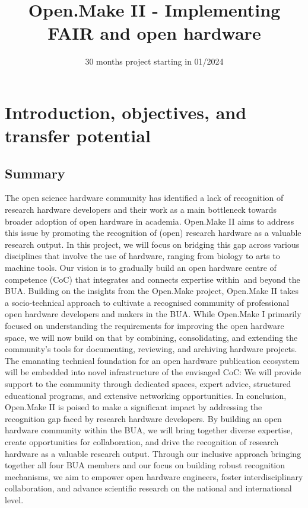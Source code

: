 \documentclass[
  12pt,
  a4paper,
]{article}
\title{Open.Make II - Implementing FAIR and open hardware}
\subtitle{30 months project starting in 01/2024}
\author{
Prof.~Dr.-Ing. Roland Jochem \\
Chair of Quality Science, Institute for Machine Tools \\
and Factory Management, Technische Universität Berlin (TUB) \\
\href{mailto:roland.jochem@tu-berlin.de}{\nolinkurl{roland.jochem@tu-berlin.de}}\\
+49 30 314 22005. \\
\and 
Prof.~Matthew Larkum, PhD \\
 \\
Institute of Biology, Humboldt-Universität zu Berlin (HUB). \\
\href{mailto:matthew.larkum@hu-berlin.de}{\nolinkurl{matthew.larkum@hu-berlin.de}}\\
+49 30 450 539 152. \\
\and 
Prof.~Dr.~Tim Landgraf \\
Dahlem Center for Machine Learning and Robotics, \\
Institute of Computer Science, Freie Universität Berlin (FUB) \\
\href{mailto:tim.landgraf@fu-berlin.de}{\nolinkurl{tim.landgraf@fu-berlin.de}}\\
+49 30 838 75114. \\
\and 
Prof.~Dr.~med. Petra Ritter \\
Berlin Institute of Health \& Dept. of Neurology \\
Charité - Universitätsmedizin Berlin (CUB) \\
\href{mailto:petra.ritter@bih-charite.de}{\nolinkurl{petra.ritter@bih-charite.de}}\\
+49 30 450 560 005 \\
\and }
\date{}
\begin{document}
\maketitle

\newpage

\hypertarget{introduction-objectives-and-transfer-potential}{%
\section{Introduction, objectives, and transfer
potential}\label{introduction-objectives-and-transfer-potential}}

\hypertarget{summary}{%
\subsection{Summary}\label{summary}}

The open science hardware community has identified a lack of recognition
of research hardware developers and their work as a main bottleneck
towards broader adoption of open hardware in academia. Open.Make II aims
to address this issue by promoting the recognition of (open) research
hardware as a valuable research output. In this project, we will focus
on bridging this gap across various disciplines that involve the use of
hardware, ranging from biology to arts to machine tools. Our vision is
to gradually build an open hardware centre of competence (CoC) that
integrates and connects expertise within~and beyond the BUA. Building on
the insights from the Open.Make project, Open.Make II takes a
socio-technical approach to cultivate a recognised community of
professional open hardware developers and makers in the BUA. While
Open.Make I primarily focused on understanding the requirements for
improving the open hardware space, we will now build on that by
combining, consolidating, and extending the community's tools for
documenting, reviewing, and archiving hardware projects. The emanating
technical foundation for an open hardware publication ecosystem will be
embedded into novel infrastructure of the envisaged CoC: We will provide
support to the community through dedicated spaces, expert advice,
structured educational programs, and extensive networking opportunities.
In conclusion, Open.Make II is poised to make a significant impact by
addressing the recognition gap faced by research hardware developers. By
building an open hardware community within the BUA, we will bring
together diverse expertise, create opportunities for collaboration, and
drive the recognition of research hardware as a valuable research
output. Through our inclusive approach bringing together all four BUA
members and our focus on building robust recognition mechanisms, we aim
to empower open hardware engineers, foster interdisciplinary
collaboration, and advance scientific research on the national and
international level.
\end{document}
